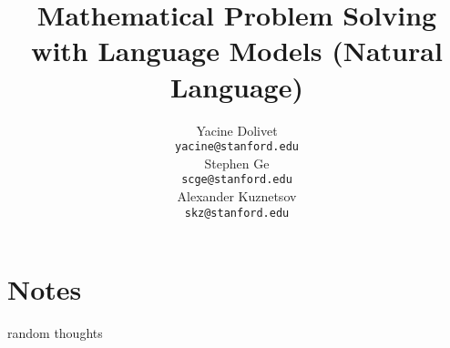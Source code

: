 \documentclass{article}
\title{Mathematical Problem Solving with Language Models (Natural Language)}
\author{
  Yacine Dolivet\\
  \texttt{yacine@stanford.edu} \\
  \And
  Stephen Ge\\
  \texttt{scge@stanford.edu} \\
   \And
  Alexander Kuznetsov\\
  \texttt{skz@stanford.edu} \\
}
\begin{document}


\maketitle


\section{Notes}
random thoughts \cite{wang2024}



\end{document}
